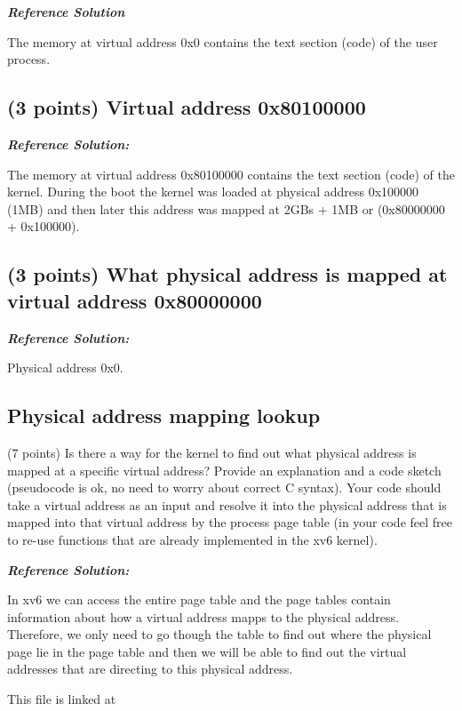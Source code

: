 \documentclass[]{article}
\begin{document}
\textbf{\emph{Reference Solution}}

The memory at virtual address 0x0 contains the text section (code) of
the user process.

\hypertarget{points-virtual-address-0x80100000}{%
\subsection{(3 points) Virtual address
0x80100000}\label{points-virtual-address-0x80100000}}

\textbf{\emph{Reference Solution:}}

The memory at virtual address 0x80100000 contains the text section
(code) of the kernel. During the boot the kernel was loaded at physical
address 0x100000 (1MB) and then later this address was mapped at 2GBs +
1MB or (0x80000000 + 0x100000).

\hypertarget{points-what-physical-address-is-mapped-at-virtual-address-0x80000000}{%
\subsection{(3 points) What physical address is mapped at virtual
address
0x80000000}\label{points-what-physical-address-is-mapped-at-virtual-address-0x80000000}}

\textbf{\emph{Reference Solution:}}

Physical address 0x0.

\hypertarget{physical-address-mapping-lookup}{%
\subsection{Physical address mapping
lookup}\label{physical-address-mapping-lookup}}

(7 points) Is there a way for the kernel to find out what physical
address is mapped at a specific virtual address? Provide an explanation
and a code sketch (pseudocode is ok, no need to worry about correct C
syntax). Your code should take a virtual address as an input and resolve
it into the physical address that is mapped into that virtual address by
the process page table (in your code feel free to re-use functions that
are already implemented in the xv6 kernel).

\textbf{\emph{Reference Solution:}}

In xv6 we can access the entire page table and the page tables contain
information about how a virtual address mapps to the physical address.
Therefore, we only need to go though the table to find out where the
physical page lie in the page table and then we will be able to find out
the virtual addresses that are directing to this physical address.

This file is linked at
\end{document}
